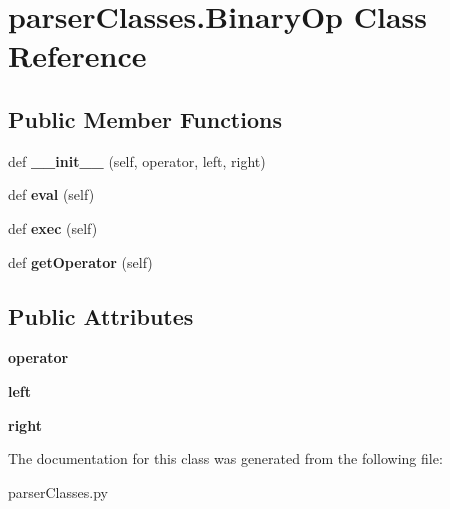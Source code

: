 \hypertarget{classparser_classes_1_1_binary_op}{}\section{parser\+Classes.\+Binary\+Op Class Reference}
\label{classparser_classes_1_1_binary_op}
\subsection*{Public Member Functions}
\begin{DoxyCompactItemize}
\item 
\mbox{\label{classparser_classes_1_1_binary_op_a554daa9084dec66629f4b9582793555d}} 
def {\bfseries \+\_\+\+\_\+init\+\_\+\+\_\+} (self, operator, left, right)
\item 
\mbox{\label{classparser_classes_1_1_binary_op_af5b9586e9192fbd0e829d4f514cd7647}} 
def {\bfseries eval} (self)
\item 
\mbox{\label{classparser_classes_1_1_binary_op_a44c9156cf60631383bc9147b61604ba4}} 
def {\bfseries exec} (self)
\item 
\mbox{\label{classparser_classes_1_1_binary_op_ae7a261476e32638d9ce21cc311c86a85}} 
def {\bfseries get\+Operator} (self)
\end{DoxyCompactItemize}
\subsection*{Public Attributes}
\begin{DoxyCompactItemize}
\item 
\mbox{\label{classparser_classes_1_1_binary_op_a4fd8150b750a4dcdaaccedc83ef3d679}} 
{\bfseries operator}
\item 
\mbox{\label{classparser_classes_1_1_binary_op_acf5520d9ff520e7477caff66289a3206}} 
{\bfseries left}
\item 
\mbox{\label{classparser_classes_1_1_binary_op_a333e735c904ef6750472deba2fd9d85f}} 
{\bfseries right}
\end{DoxyCompactItemize}


The documentation for this class was generated from the following file\+:\begin{DoxyCompactItemize}
\item 
parser\+Classes.\+py\end{DoxyCompactItemize}
